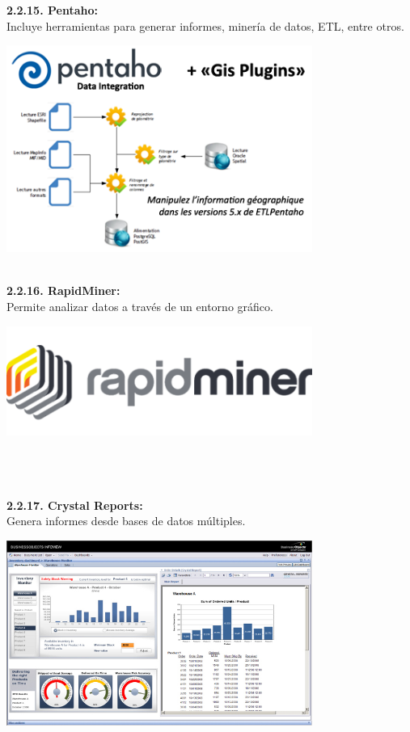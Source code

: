 \begin{flushleft}
\textbf{2.2.15. Pentaho: }\\ 
Incluye herramientas para generar informes, minería de datos, ETL, entre otros.
	\begin{center}
	\includegraphics[width=10cm]{./Imagenes/BIimagen15}
	\end{center}
\textbf{}\\
	
\textbf{2.2.16. RapidMiner: }\\
Permite analizar datos a través de un entorno gráfico.
	\begin{center}
	\includegraphics[width=10cm]{./Imagenes/BIimagen16}
	\end{center}

\textbf{}\\
\textbf{}\\
\textbf{}\\
\textbf{2.2.17. Crystal Reports: }\\
Genera informes desde bases de datos múltiples.
	\begin{center}
	\includegraphics[width=10cm]{./Imagenes/BIimagen17}
	\end{center}


\end{flushleft}

